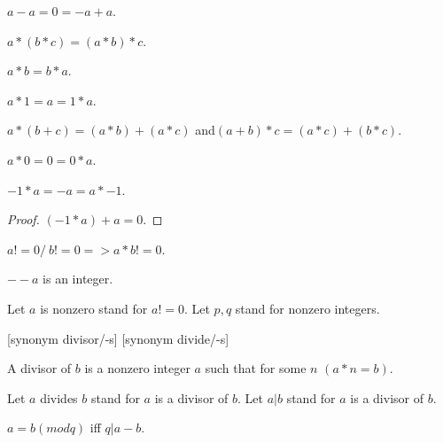 \documentclass{article}
\begin{document}
\begin{forthel}
    \begin{axiom}[AddNeg]
      $a - a = 0 = -a + a$.
    \end{axiom}

    \begin{axiom}[MulAsso]
      $a * (b * c) = (a * b) * c$.
    \end{axiom}

    \begin{axiom}[MulComm]
      $a * b = b * a$.
    \end{axiom}

    \begin{axiom}[MulOne]
      $a * 1 = a = 1 * a$.
    \end{axiom}

    \begin{axiom}[Distrib]
      $a * (b + c) = (a*b) + (a*c)$ and$ (a + b) * c = (a*c) + (b*c)$.
    \end{axiom}

    \begin{lemma}[MulZero]
      $a * 0 = 0 = 0 * a$.
    \end{lemma}

    \begin{lemma}[MulMinOne]
      $-1 * a = -a = a * -1$.
    \end{lemma}
    \begin{proof}
      $(-1 * a) + a = 0$.
    \end{proof}

    \begin{axiom}[ZeroDiv]
      $a != 0 /\ b != 0 => a * b != 0$.
    \end{axiom}

    \begin{lemma}
      $--a$ is an integer.
    \end{lemma}

    Let $a$ is nonzero stand for $a != 0$.
    Let $p,q$ stand for nonzero integers.

    [synonym divisor/-s] [synonym divide/-s]

    \begin{definition}[Divisor]
      A divisor of $b$ is a nonzero integer $a$ such that for some $n$ $(a * n = b)$.
    \end{definition}

    Let $a$ divides $b$ stand for $a$ is a divisor of $b$.
    Let $a | b$ stand for $a$ is a divisor of $b$.

    \begin{definition}[EquMod]
      $a = b (mod q)$ iff $q | a-b$.
    \end{definition}


\end{forthel}
\end{document}

